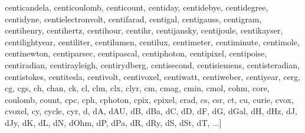 \documentclass[letterpaper,10pt,english]{sphinxmanual}
\begin{document}
\begin{sphinxVerbatim}[commandchars=\\\{\}]
 \PYGZsq{}centicandela\PYGZsq{},
 \PYGZsq{}centicoulomb\PYGZsq{},
 \PYGZsq{}centicount\PYGZsq{},
 \PYGZsq{}centiday\PYGZsq{},
 \PYGZsq{}centidebye\PYGZsq{},
 \PYGZsq{}centidegree\PYGZsq{},
 \PYGZsq{}centidyne\PYGZsq{},
 \PYGZsq{}centielectronvolt\PYGZsq{},
 \PYGZsq{}centifarad\PYGZsq{},
 \PYGZsq{}centigal\PYGZsq{},
 \PYGZsq{}centigauss\PYGZsq{},
 \PYGZsq{}centigram\PYGZsq{},
 \PYGZsq{}centihenry\PYGZsq{},
 \PYGZsq{}centihertz\PYGZsq{},
 \PYGZsq{}centihour\PYGZsq{},
 \PYGZsq{}centihr\PYGZsq{},
 \PYGZsq{}centijansky\PYGZsq{},
 \PYGZsq{}centijoule\PYGZsq{},
 \PYGZsq{}centikayser\PYGZsq{},
 \PYGZsq{}centilightyear\PYGZsq{},
 \PYGZsq{}centiliter\PYGZsq{},
 \PYGZsq{}centilumen\PYGZsq{},
 \PYGZsq{}centilux\PYGZsq{},
 \PYGZsq{}centimeter\PYGZsq{},
 \PYGZsq{}centiminute\PYGZsq{},
 \PYGZsq{}centimole\PYGZsq{},
 \PYGZsq{}centinewton\PYGZsq{},
 \PYGZsq{}centiparsec\PYGZsq{},
 \PYGZsq{}centipascal\PYGZsq{},
 \PYGZsq{}centiphoton\PYGZsq{},
 \PYGZsq{}centipixel\PYGZsq{},
 \PYGZsq{}centipoise\PYGZsq{},
 \PYGZsq{}centiradian\PYGZsq{},
 \PYGZsq{}centirayleigh\PYGZsq{},
 \PYGZsq{}centirydberg\PYGZsq{},
 \PYGZsq{}centisecond\PYGZsq{},
 \PYGZsq{}centisiemens\PYGZsq{},
 \PYGZsq{}centisteradian\PYGZsq{},
 \PYGZsq{}centistokes\PYGZsq{},
 \PYGZsq{}centitesla\PYGZsq{},
 \PYGZsq{}centivolt\PYGZsq{},
 \PYGZsq{}centivoxel\PYGZsq{},
 \PYGZsq{}centiwatt\PYGZsq{},
 \PYGZsq{}centiweber\PYGZsq{},
 \PYGZsq{}centiyear\PYGZsq{},
 \PYGZsq{}cerg\PYGZsq{},
 \PYGZsq{}cg\PYGZsq{},
 \PYGZsq{}cgs\PYGZsq{},
 \PYGZsq{}ch\PYGZsq{},
 \PYGZsq{}chan\PYGZsq{},
 \PYGZsq{}ck\PYGZsq{},
 \PYGZsq{}cl\PYGZsq{},
 \PYGZsq{}clm\PYGZsq{},
 \PYGZsq{}clx\PYGZsq{},
 \PYGZsq{}clyr\PYGZsq{},
 \PYGZsq{}cm\PYGZsq{},
 \PYGZsq{}cmag\PYGZsq{},
 \PYGZsq{}cmin\PYGZsq{},
 \PYGZsq{}cmol\PYGZsq{},
 \PYGZsq{}cohm\PYGZsq{},
 \PYGZsq{}core\PYGZsq{},
 \PYGZsq{}coulomb\PYGZsq{},
 \PYGZsq{}count\PYGZsq{},
 \PYGZsq{}cpc\PYGZsq{},
 \PYGZsq{}cph\PYGZsq{},
 \PYGZsq{}cphoton\PYGZsq{},
 \PYGZsq{}cpix\PYGZsq{},
 \PYGZsq{}cpixel\PYGZsq{},
 \PYGZsq{}crad\PYGZsq{},
 \PYGZsq{}cs\PYGZsq{},
 \PYGZsq{}csr\PYGZsq{},
 \PYGZsq{}ct\PYGZsq{},
 \PYGZsq{}cu\PYGZsq{},
 \PYGZsq{}curie\PYGZsq{},
 \PYGZsq{}cvox\PYGZsq{},
 \PYGZsq{}cvoxel\PYGZsq{},
 \PYGZsq{}cy\PYGZsq{},
 \PYGZsq{}cycle\PYGZsq{},
 \PYGZsq{}cyr\PYGZsq{},
 \PYGZsq{}d\PYGZsq{},
 \PYGZsq{}dA\PYGZsq{},
 \PYGZsq{}dAU\PYGZsq{},
 \PYGZsq{}dB\PYGZsq{},
 \PYGZsq{}dBa\PYGZsq{},
 \PYGZsq{}dC\PYGZsq{},
 \PYGZsq{}dD\PYGZsq{},
 \PYGZsq{}dF\PYGZsq{},
 \PYGZsq{}dG\PYGZsq{},
 \PYGZsq{}dGal\PYGZsq{},
 \PYGZsq{}dH\PYGZsq{},
 \PYGZsq{}dHz\PYGZsq{},
 \PYGZsq{}dJ\PYGZsq{},
 \PYGZsq{}dJy\PYGZsq{},
 \PYGZsq{}dK\PYGZsq{},
 \PYGZsq{}dL\PYGZsq{},
 \PYGZsq{}dN\PYGZsq{},
 \PYGZsq{}dOhm\PYGZsq{},
 \PYGZsq{}dP\PYGZsq{},
 \PYGZsq{}dPa\PYGZsq{},
 \PYGZsq{}dR\PYGZsq{},
 \PYGZsq{}dRy\PYGZsq{},
 \PYGZsq{}dS\PYGZsq{},
 \PYGZsq{}dSt\PYGZsq{},
 \PYGZsq{}dT\PYGZsq{},
 ...]
\end{sphinxVerbatim}
\end{document}

